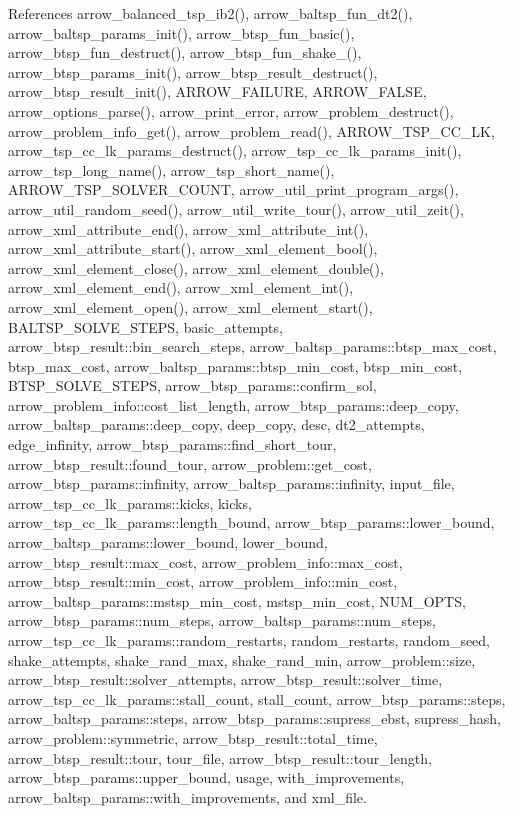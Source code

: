 References arrow\_\-balanced\_\-tsp\_\-ib2(), arrow\_\-baltsp\_\-fun\_\-dt2(), arrow\_\-baltsp\_\-params\_\-init(), arrow\_\-btsp\_\-fun\_\-basic(), arrow\_\-btsp\_\-fun\_\-destruct(), arrow\_\-btsp\_\-fun\_\-shake\_(), arrow\_\-btsp\_\-params\_\-init(), arrow\_\-btsp\_\-result\_\-destruct(), arrow\_\-btsp\_\-result\_\-init(), ARROW\_\-FAILURE, ARROW\_\-FALSE, arrow\_\-options\_\-parse(), arrow\_\-print\_\-error, arrow\_\-problem\_\-destruct(), arrow\_\-problem\_\-info\_\-get(), arrow\_\-problem\_\-read(), ARROW\_\-TSP\_\-CC\_\-LK, arrow\_\-tsp\_\-cc\_\-lk\_\-params\_\-destruct(), arrow\_\-tsp\_\-cc\_\-lk\_\-params\_\-init(), arrow\_\-tsp\_\-long\_\-name(), arrow\_\-tsp\_\-short\_\-name(), ARROW\_\-TSP\_\-SOLVER\_\-COUNT, arrow\_\-util\_\-print\_\-program\_\-args(), arrow\_\-util\_\-random\_\-seed(), arrow\_\-util\_\-write\_\-tour(), arrow\_\-util\_\-zeit(), arrow\_\-xml\_\-attribute\_\-end(), arrow\_\-xml\_\-attribute\_\-int(), arrow\_\-xml\_\-attribute\_\-start(), arrow\_\-xml\_\-element\_\-bool(), arrow\_\-xml\_\-element\_\-close(), arrow\_\-xml\_\-element\_\-double(), arrow\_\-xml\_\-element\_\-end(), arrow\_\-xml\_\-element\_\-int(), arrow\_\-xml\_\-element\_\-open(), arrow\_\-xml\_\-element\_\-start(), BALTSP\_\-SOLVE\_\-STEPS, basic\_\-attempts, arrow\_\-btsp\_\-result::bin\_\-search\_\-steps, arrow\_\-baltsp\_\-params::btsp\_\-max\_\-cost, btsp\_\-max\_\-cost, arrow\_\-baltsp\_\-params::btsp\_\-min\_\-cost, btsp\_\-min\_\-cost, BTSP\_\-SOLVE\_\-STEPS, arrow\_\-btsp\_\-params::confirm\_\-sol, arrow\_\-problem\_\-info::cost\_\-list\_\-length, arrow\_\-btsp\_\-params::deep\_\-copy, arrow\_\-baltsp\_\-params::deep\_\-copy, deep\_\-copy, desc, dt2\_\-attempts, edge\_\-infinity, arrow\_\-btsp\_\-params::find\_\-short\_\-tour, arrow\_\-btsp\_\-result::found\_\-tour, arrow\_\-problem::get\_\-cost, arrow\_\-btsp\_\-params::infinity, arrow\_\-baltsp\_\-params::infinity, input\_\-file, arrow\_\-tsp\_\-cc\_\-lk\_\-params::kicks, kicks, arrow\_\-tsp\_\-cc\_\-lk\_\-params::length\_\-bound, arrow\_\-btsp\_\-params::lower\_\-bound, arrow\_\-baltsp\_\-params::lower\_\-bound, lower\_\-bound, arrow\_\-btsp\_\-result::max\_\-cost, arrow\_\-problem\_\-info::max\_\-cost, arrow\_\-btsp\_\-result::min\_\-cost, arrow\_\-problem\_\-info::min\_\-cost, arrow\_\-baltsp\_\-params::mstsp\_\-min\_\-cost, mstsp\_\-min\_\-cost, NUM\_\-OPTS, arrow\_\-btsp\_\-params::num\_\-steps, arrow\_\-baltsp\_\-params::num\_\-steps, arrow\_\-tsp\_\-cc\_\-lk\_\-params::random\_\-restarts, random\_\-restarts, random\_\-seed, shake\_\-attempts, shake\_\-rand\_\-max, shake\_\-rand\_\-min, arrow\_\-problem::size, arrow\_\-btsp\_\-result::solver\_\-attempts, arrow\_\-btsp\_\-result::solver\_\-time, arrow\_\-tsp\_\-cc\_\-lk\_\-params::stall\_\-count, stall\_\-count, arrow\_\-btsp\_\-params::steps, arrow\_\-baltsp\_\-params::steps, arrow\_\-btsp\_\-params::supress\_\-ebst, supress\_\-hash, arrow\_\-problem::symmetric, arrow\_\-btsp\_\-result::total\_\-time, arrow\_\-btsp\_\-result::tour, tour\_\-file, arrow\_\-btsp\_\-result::tour\_\-length, arrow\_\-btsp\_\-params::upper\_\-bound, usage, with\_\-improvements, arrow\_\-baltsp\_\-params::with\_\-improvements, and xml\_\-file.

